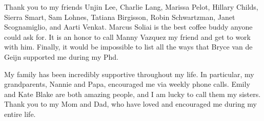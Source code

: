Thank you to my friends Unjin Lee, Charlie Lang, Marissa Pelot, Hillary Childs, Sierra Smart, Sam Lohnes, Tatiana Birgisson, Robin Schwartzman, Janet Scognamiglio, and Aarti Venkat. Marcus Soliai is the best coffee buddy anyone could ask for. It is an honor to call Manny Vazquez my friend and get to work with him. Finally, it would be impossible to list all the ways that Bryce van de Geijn supported me during my Phd. 


My family has been incredibly supportive throughout my life. In particular, my grandparents, Nannie and Papa, encouraged me via weekly phone calls. Emily and Kate Blake are both amazing people, and I am lucky to call them my sisters.  Thank you to my Mom and Dad, who have loved and encouraged me during my entire life. 